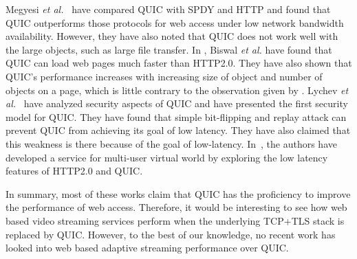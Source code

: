 Megyesi \textit{et al.}~\cite{Megyesi2016} have compared QUIC with SPDY and HTTP and found that QUIC outperforms those protocols for web access under low network bandwidth availability. However, they have also noted that QUIC does not work well with the large objects, such as large file transfer. In \cite{Biswal2016}, Biswal \textit{et al.} have found that QUIC can load web pages much faster than HTTP2.0. They have also shown that QUIC's performance increases with increasing size of object and number of objects on a page, which is little contrary to the observation given by \cite{Megyesi2016}. Lychev \textit{et al.}~\cite{Lychev2015} have analyzed security aspects of QUIC and have presented the first security model for QUIC. They have found that simple bit-flipping and replay attack can prevent QUIC from achieving its goal of low latency. They have also claimed that this weakness is there because of the goal of low-latency. In~\cite{bakri2015http}, the authors have developed a service for multi-user virtual world by exploring the low latency features of HTTP2.0 and QUIC. 

In summary, most of these works claim that QUIC has the proficiency to improve the performance of web access.
Therefore, it would be interesting to see how web based video streaming services perform when the underlying TCP+TLS stack is replaced by QUIC. However, to the best of our knowledge, no recent work has looked into web based adaptive streaming performance over QUIC. 


